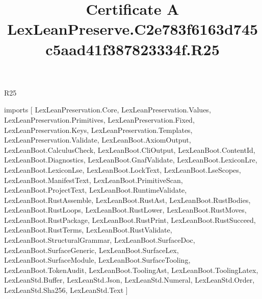 \begin{lexlean}{R25}
\title{Certificate A LexLeanPreserve.C2e783f6163d745c5aad41f387823334f.R25}
\begin{coremodule}
imports [
  LexLeanPreservation.Core,
  LexLeanPreservation.Values,
  LexLeanPreservation.Primitives,
  LexLeanPreservation.Fixed,
  LexLeanPreservation.Keys,
  LexLeanPreservation.Templates,
  LexLeanPreservation.Validate,
  LexLeanBoot.AxiomOutput,
  LexLeanBoot.CalculusCheck,
  LexLeanBoot.CliOutput,
  LexLeanBoot.ContentId,
  LexLeanBoot.Diagnostics,
  LexLeanBoot.GnafValidate,
  LexLeanBoot.LexiconLre,
  LexLeanBoot.LexiconLse,
  LexLeanBoot.LockText,
  LexLeanBoot.LseScopes,
  LexLeanBoot.ManifestText,
  LexLeanBoot.PrimitiveScan,
  LexLeanBoot.ProjectText,
  LexLeanBoot.RuntimeValidate,
  LexLeanBoot.RustAssemble,
  LexLeanBoot.RustAst,
  LexLeanBoot.RustBodies,
  LexLeanBoot.RustLoops,
  LexLeanBoot.RustLower,
  LexLeanBoot.RustMoves,
  LexLeanBoot.RustPackage,
  LexLeanBoot.RustPrint,
  LexLeanBoot.RustSucceed,
  LexLeanBoot.RustTerms,
  LexLeanBoot.RustValidate,
  LexLeanBoot.StructuralGrammar,
  LexLeanBoot.SurfaceDoc,
  LexLeanBoot.SurfaceGeneric,
  LexLeanBoot.SurfaceLex,
  LexLeanBoot.SurfaceModule,
  LexLeanBoot.SurfaceTooling,
  LexLeanBoot.TokenAudit,
  LexLeanBoot.ToolingAst,
  LexLeanBoot.ToolingLatex,
  LexLeanStd.Buffer,
  LexLeanStd.Json,
  LexLeanStd.Numeral,
  LexLeanStd.Order,
  LexLeanStd.Sha256,
  LexLeanStd.Text
]


\end{coremodule}
\end{lexlean}
